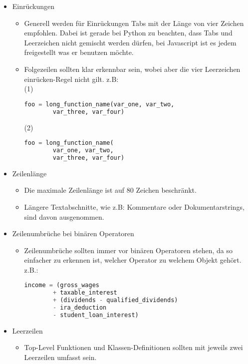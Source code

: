 \begin{itemize}
	\item Einrückungen
	\begin{itemize}
		\item Generell werden für Einrückungen Tabs mit der Länge von vier Zeichen empfohlen. Dabei ist gerade bei Python zu beachten, dass Tabs und Leerzeichen nicht gemischt werden dürfen, bei Javascript ist es jedem freigestellt was er benutzen möchte.
		\item Folgezeilen sollten klar erkennbar sein, wobei aber die \grqq vier Leerzeichen einrücken\grqq -Regel nicht gilt.
		z.B: \\
		(1)
		\begin{lstlisting}[language=python]
		foo = long_function_name(var_one, var_two,
		var_three, var_four)
		\end{lstlisting}
		(2) 
		\begin{lstlisting}[language=python]
		foo = long_function_name(
		var_one, var_two,
		var_three, var_four)   
		\end{lstlisting}
	\end{itemize}
	\item Zeilenlänge
	\begin{itemize}
		\item Die maximale Zeilenlänge ist auf 80 Zeichen beschränkt. 
		\item Längere Textabschnitte, wie z.B: Kommentare oder Dokumentarstrings, sind davon ausgenommen.
	\end{itemize}
	\item Zeilenumbrüche bei binären Operatoren
	\begin{itemize}
		\item Zeilenumbrüche sollten immer vor binären Operatoren stehen, da so einfacher zu erkennen ist, welcher Operator zu welchem Objekt gehört.
		z.B.: 
		\begin{lstlisting}[language=python]
		income = (gross_wages
		+ taxable_interest
		+ (dividends - qualified_dividends)
		- ira_deduction
		- student_loan_interest)
		\end{lstlisting}
	\end{itemize}
	\item Leerzeilen
	\begin{itemize}
		\item Top-Level Funktionen und Klassen-Definitionen sollten mit jeweils zwei Leerzeilen umfasst sein.

\end{itemize}
\end{itemize}
